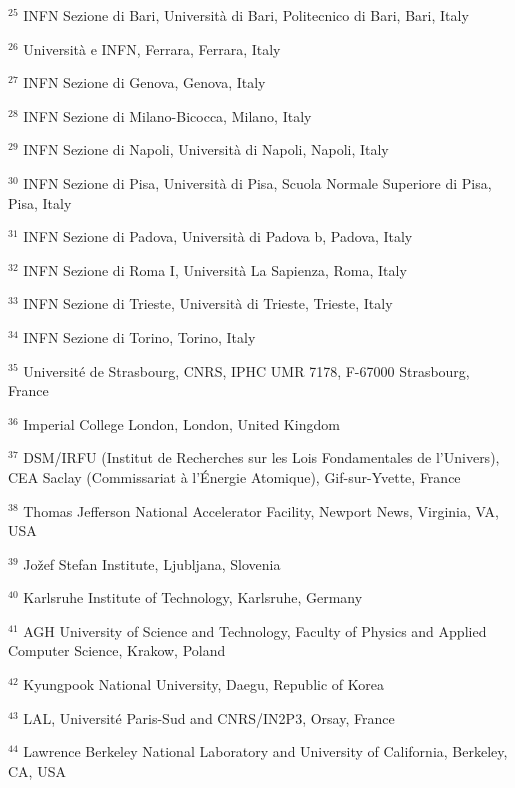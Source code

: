 \par {\footnotesize $^{25}$ INFN Sezione di Bari, Università di Bari, Politecnico di Bari, Bari, Italy}
\par {\footnotesize $^{26}$ Università e INFN, Ferrara, Ferrara, Italy}
\par {\footnotesize $^{27}$ INFN Sezione di Genova, Genova, Italy}
\par {\footnotesize $^{28}$ INFN Sezione di Milano-Bicocca, Milano, Italy}
\par {\footnotesize $^{29}$ INFN Sezione di Napoli, Università di Napoli, Napoli, Italy}
\par {\footnotesize $^{30}$ INFN Sezione di Pisa, Università di Pisa, Scuola Normale Superiore di Pisa, Pisa, Italy}
\par {\footnotesize $^{31}$ INFN Sezione di Padova, Università di Padova b, Padova, Italy}
\par {\footnotesize $^{32}$ INFN Sezione di Roma I, Università La Sapienza, Roma, Italy}
\par {\footnotesize $^{33}$ INFN Sezione di Trieste, Università di Trieste, Trieste, Italy}
\par {\footnotesize $^{34}$ INFN Sezione di Torino, Torino, Italy}
\par {\footnotesize $^{35}$ Université de Strasbourg, CNRS, IPHC UMR 7178, F-67000 Strasbourg, France}
\par {\footnotesize $^{36}$ Imperial College London, London, United Kingdom}
\par {\footnotesize $^{37}$ DSM/IRFU (Institut de Recherches sur les Lois Fondamentales de l’Univers), CEA Saclay (Commissariat à l’Énergie Atomique), Gif-sur-Yvette, France}
\par {\footnotesize $^{38}$ Thomas Jefferson National Accelerator Facility, Newport News, Virginia, VA, USA}
\par {\footnotesize $^{39}$ Jožef Stefan Institute, Ljubljana, Slovenia}
\par {\footnotesize $^{40}$ Karlsruhe Institute of Technology, Karlsruhe, Germany}
\par {\footnotesize $^{41}$ AGH University of Science and Technology, Faculty of Physics and Applied Computer Science, Krakow, Poland}
\par {\footnotesize $^{42}$ Kyungpook National University, Daegu, Republic of Korea}
\par {\footnotesize $^{43}$ LAL, Université Paris-Sud and CNRS/IN2P3, Orsay, France}
\par {\footnotesize $^{44}$ Lawrence Berkeley National Laboratory and University of California, Berkeley, CA, USA}
